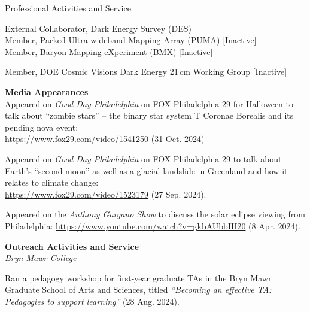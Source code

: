 \documentclass{resume} %
\begin{document}
\begin{rSection}{Professional Activities and Service}

\begin{description}[leftmargin=10em, style=nextline]

\item[Collaborations] External Collaborator, Dark Energy Survey (DES)\\
  Member, Packed Ultra-wideband Mapping Array (PUMA) [Inactive]\\
  Member, Baryon Mapping eXperiment (BMX) [Inactive]

\item[Working Groups] Member, DOE Cosmic Visions Dark Energy 21$\,$cm Working Group [Inactive]


\end{description}
\textbf{Media Appearances}\\
Appeared on \textit{Good Day Philadelphia} on FOX Philadelphia 29 for Halloween to talk about ``zombie stars'' -- the binary star system T Coronae Borealis and its pending nova event:\\
\href{https://www.fox29.com/video/1541250}{https://www.fox29.com/video/1541250} (31 Oct. 2024)

Appeared on \textit{Good Day Philadelphia} on FOX Philadelphia 29 to talk about Earth's ``second moon'' as well as a glacial landslide in Greenland and how it relates to climate change: \\
\href{https://www.fox29.com/video/1523179}{https://www.fox29.com/video/1523179} (27 Sep. 2024).

Appeared on the \textit{Anthony Gargano Show} to discuss the solar eclipse viewing from Philadelphia: \href{https://www.youtube.com/watch?v=gkbAUbbIH20}{https://www.youtube.com/watch?v=gkbAUbbIH20} (8 Apr. 2024).

\textbf{Outreach Activities and Service}\\
\textit{Bryn Mawr College}
\begin{description}[leftmargin=2em, style=nextline]
\vspace{-0.5em}
\item[~] Ran a pedagogy workshop for first-year graduate TAs in the Bryn Mawr Graduate School of Arts and Sciences, titled \textit{``Becoming an effective TA: Pedagogies to support learning''} (28 Aug. 2024).
\end{description}



\end{rSection}
\end{document}
